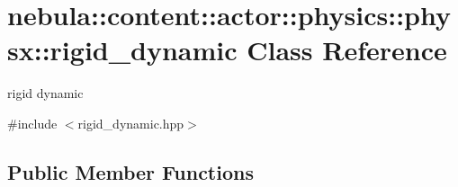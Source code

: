 \hypertarget{classnebula_1_1content_1_1actor_1_1physics_1_1physx_1_1rigid__dynamic}{
\section{nebula::content::actor::physics::physx::rigid\_\-dynamic Class Reference}
\label{classnebula_1_1content_1_1actor_1_1physics_1_1physx_1_1rigid__dynamic}
}


rigid dynamic  


{\ttfamily \#include $<$rigid\_\-dynamic.hpp$>$}\subsection*{Public Member Functions}
